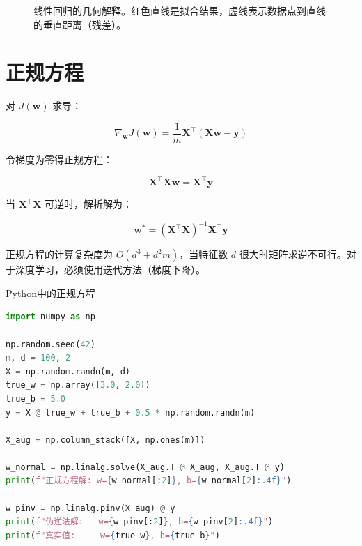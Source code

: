 \begin{figure}[H]
\centering
{}
\caption{线性回归的几何解释。红色直线是拟合结果，虚线表示数据点到直线的垂直距离（残差）。}
\label{fig:linear-regression}
\end{figure}

\section{正规方程}

对 $J(\mathbf{w})$ 求导：

\[
\nabla_{\mathbf{w}} J(\mathbf{w}) = \frac{1}{m}\mathbf{X}^{\top}(\mathbf{X}\mathbf{w} - \mathbf{y})
\]

令梯度为零得正规方程：

\[
\mathbf{X}^{\top}\mathbf{X}\mathbf{w} = \mathbf{X}^{\top}\mathbf{y}
\]

当 $\mathbf{X}^{\top}\mathbf{X}$ 可逆时，解析解为：

\[
\mathbf{w}^* = (\mathbf{X}^{\top}\mathbf{X})^{-1}\mathbf{X}^{\top}\mathbf{y}
\]

正规方程的计算复杂度为 $O(d^3 + d^2m)$，当特征数 $d$ 很大时矩阵求逆不可行。对于深度学习，必须使用迭代方法（梯度下降）。

\begin{mycode}{Python中的正规方程}
\begin{lstlisting}[language=Python]
import numpy as np

np.random.seed(42)
m, d = 100, 2
X = np.random.randn(m, d)
true_w = np.array([3.0, 2.0])
true_b = 5.0
y = X @ true_w + true_b + 0.5 * np.random.randn(m)

X_aug = np.column_stack([X, np.ones(m)])

w_normal = np.linalg.solve(X_aug.T @ X_aug, X_aug.T @ y)
print(f"正规方程解: w={w_normal[:2]}, b={w_normal[2]:.4f}")

w_pinv = np.linalg.pinv(X_aug) @ y
print(f"伪逆法解:   w={w_pinv[:2]}, b={w_pinv[2]:.4f}")
print(f"真实值:     w={true_w}, b={true_b}")
\end{lstlisting}
\end{mycode}

